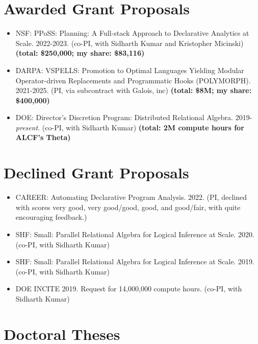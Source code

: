 \documentclass[line]{res}
\begin{document}
\begin{resume}
\section{\large Awarded Grant Proposals} \vspace{0.5cm}

\begin{itemize}
  \item
  NSF: PPoSS: Planning: A Full-stack Approach to Declarative Analytics at Scale. 2022-2023. (co-PI, with Sidharth Kumar and Kristopher Micinski) \textbf{(total: \$250,000; my share: \$83,116)} 
  \item
  DARPA: VSPELLS: Promotion to Optimal Languages Yielding Modular Operator-driven Replacements and Programmatic Hooks (POLYMORPH). 2021-2025. (PI, via subcontract with Galois, inc) \textbf{(total: \$8M; my share: \$400,000)}
  \item
  DOE: Director's Discretion Program: Distributed Relational Algebra. 2019-\textit{present}. (co-PI, with Sidharth Kumar) \textbf{(total: 2M compute hours for ALCF's Theta)}
\end{itemize}

\section{\large Declined Grant Proposals} \vspace{0.5cm}

\begin{itemize} 
  \item
  CAREER: Automating Declarative Program Analysis. 2022. (PI, declined with scores very good, very good/good, good, and good/fair, with quite encouraging feedback.) 
  \item
  SHF: Small: Parallel Relational Algebra for Logical Inference at Scale. 2020. (co-PI, with Sidharth Kumar) 
  \item
  SHF: Small: Parallel Relational Algebra for Logical Inference at Scale. 2019. (co-PI, with Sidharth Kumar)
  \item
  DOE INCITE 2019. Request for 14,000,000 compute hours. (co-PI, with Sidharth Kumar)  
\end{itemize}

\section{\large Doctoral Theses} \vspace{0.3cm}

\vspace{-0.4cm}


\end{resume}
\end{document}
